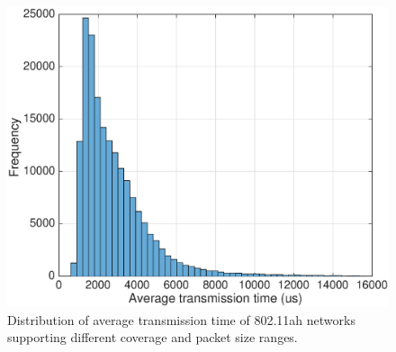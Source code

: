 % 





\begin{figure}[t]
  \centering
  \includegraphics[width=0.75\columnwidth]{figures/histTx}
  \caption{Distribution of average transmission time of 802.11ah networks supporting different coverage and packet size ranges. \label{fig:tx-hist}}
\end{figure}


